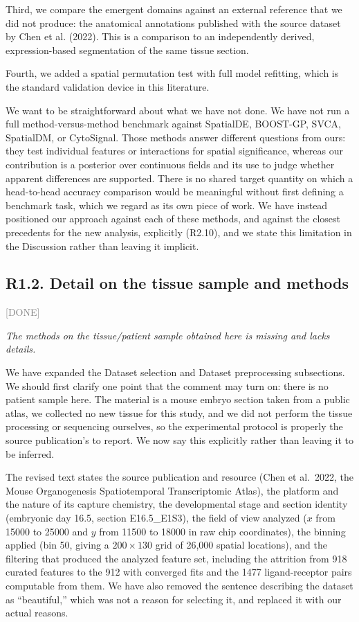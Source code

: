 \documentclass[11pt]{article}
\newcommand{\status}[1]{\textcolor{gray}{\small\textsf{[#1]}}}
\newenvironment{rev}{\begin{leftbar}\itshape\small}{\end{leftbar}}
\begin{document}
Third, we compare the emergent domains against an external reference that we did not
produce: the anatomical annotations published with the source dataset by Chen et al.
(2022). This is a comparison to an independently derived, expression-based segmentation
of the same tissue section.

Fourth, we added a spatial permutation test with full model refitting, which is the
standard validation device in this literature.

We want to be straightforward about what we have not done. We have not run a full
method-versus-method benchmark against SpatialDE, BOOST-GP, SVCA, SpatialDM, or
CytoSignal. Those methods answer different questions from ours: they test individual
features or interactions for spatial significance, whereas our contribution is a
posterior over continuous fields and its use to judge whether apparent differences are
supported. There is no shared target quantity on which a head-to-head accuracy comparison would
be meaningful without first defining a benchmark task, which we regard as its own piece of work.
We have instead positioned our approach against each of these methods, and against the closest
precedents for the new analysis, explicitly (R2.10), and we state this limitation in the
Discussion rather than leaving it implicit.

\subsection{R1.2. Detail on the tissue sample and methods} \status{DONE}

\begin{rev}
The methods on the tissue/patient sample obtained here is missing and lacks details.
\end{rev}

\noindent We have expanded the Dataset selection and Dataset preprocessing subsections. We
should first clarify one point that the comment may turn on: there is no patient sample
here. The material is a mouse embryo section taken from a public atlas, we collected no
new tissue for this study, and we did not perform the tissue processing or sequencing
ourselves, so the experimental protocol is properly the source publication's to report. We
now say this explicitly rather than leaving it to be inferred.

The revised text states the source publication and resource (Chen et al.\ 2022, the Mouse
Organogenesis Spatiotemporal Transcriptomic Atlas), the platform and the nature of its
capture chemistry, the developmental stage and section identity (embryonic day 16.5,
section E16.5\_E1S3), the field of view analyzed ($x$ from 15000 to 25000 and $y$ from
11500 to 18000 in raw chip coordinates), the binning applied (bin 50, giving a
$200\times130$ grid of 26,000 spatial locations), and the filtering that produced the
analyzed feature set, including the attrition from 918 curated features to the 912 with
converged fits and the 1477 ligand-receptor pairs computable from them. We have also
removed the sentence describing the dataset as ``beautiful,'' which was not a reason for
selecting it, and replaced it with our actual reasons.
\end{document}
